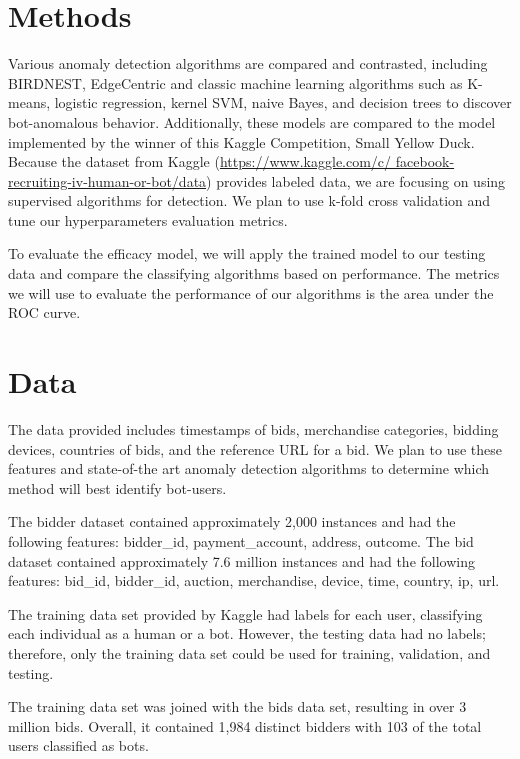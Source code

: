 \documentclass{article} %
\begin{document}
\section{Methods}

Various anomaly detection algorithms are compared and contrasted, including BIRDNEST, EdgeCentric and classic machine learning algorithms such as K-means, logistic regression, kernel SVM, naive Bayes, and decision trees to discover bot-anomalous behavior.
Additionally, these models are compared to the model implemented by the winner of this Kaggle Competition, Small Yellow Duck.
Because the dataset from Kaggle (\url{https://www.kaggle.com/c/ facebook-recruiting-iv-human-or-bot/data}) provides labeled data, we are focusing on using supervised algorithms for detection.
We plan to use k-fold cross validation and tune our hyperparameters evaluation metrics. 

To evaluate the efficacy model, we will apply the trained model to our testing data and compare the classifying algorithms based on performance.
The metrics we will use to evaluate the performance of our algorithms is the area under the ROC curve. 

\section{Data}

The data provided includes timestamps of bids, merchandise categories, bidding devices, countries of bids, and the reference URL for a bid.
We plan to use these features and state-of-the art anomaly detection algorithms to determine which method will best identify bot-users.

The bidder dataset contained approximately 2,000 instances and had the following features: bidder\_id, payment\_account, address, outcome.
The bid dataset contained approximately 7.6 million instances and had the following features: bid\_id, bidder\_id, auction, merchandise, device, time, country, ip, url.

The training data set provided by Kaggle had labels for each user, classifying each individual as a human or a bot.
However, the testing data had no labels; therefore, only the training data set could be used for training, validation, and testing.

The training data set was joined with the bids data set, resulting in over 3 million bids.
Overall, it contained 1,984 distinct bidders with 103 of the total users classified as bots.
\end{document}
